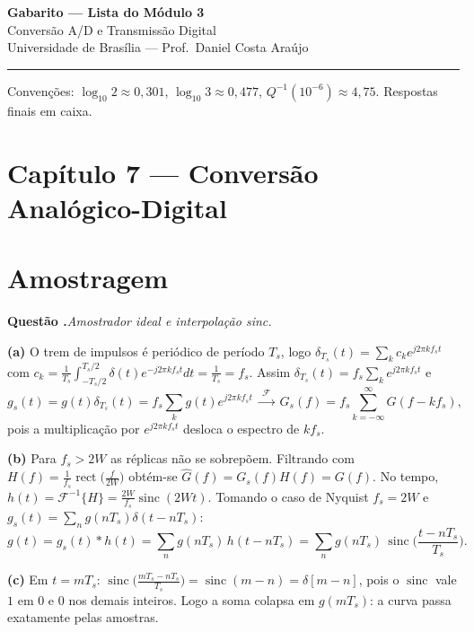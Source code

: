 \documentclass[11pt,a4paper]{article}
\newcommand{\sinc}{\operatorname{sinc}}
\newcommand{\rect}{\operatorname{rect}}
\newcounter{quest}
\newcommand{\Q}{\par\medskip\noindent\refstepcounter{quest}%
  \textbf{\color{unbprimary}Questão \thequest.}\enspace}
\newcommand{\resp}[1]{\ensuremath{\boxed{#1}}}
\begin{document}
\begin{center}
  {\LARGE\bfseries\color{unbprimary} Gabarito --- Lista do Módulo 3}\\[4pt]
  {\large Conversão A/D e Transmissão Digital}\\[6pt]
  {\small Universidade de Brasília --- Prof.\ Daniel Costa Araújo}
\end{center}

\vspace{0.2cm}
\noindent\rule{\textwidth}{0.6pt}
\small
Convenções: $\log_{10}2\approx0{,}301$, $\log_{10}3\approx0{,}477$,
$Q^{-1}(10^{-6})\approx4{,}75$. Respostas finais em caixa.
\normalsize

\section*{Capítulo 7 --- Conversão Analógico-Digital}

\section{Amostragem}

\Q\textit{Amostrador ideal e interpolação sinc.}

\textbf{(a)} O trem de impulsos é periódico de período $T_s$, logo
$\delta_{T_s}(t)=\sum_k c_k e^{j2\pi k f_s t}$ com
$c_k=\frac1{T_s}\int_{-T_s/2}^{T_s/2}\delta(t)e^{-j2\pi kf_st}dt=\frac1{T_s}=f_s$.
Assim $\delta_{T_s}(t)=f_s\sum_k e^{j2\pi kf_st}$ e
\[
  g_s(t)=g(t)\delta_{T_s}(t)=f_s\sum_k g(t)e^{j2\pi kf_st}
  \;\xrightarrow{\;\mathcal F\;}\;
  G_s(f)=f_s\sum_{k=-\infty}^{\infty}G(f-kf_s),
\]
pois a multiplicação por $e^{j2\pi kf_st}$ desloca o espectro de $kf_s$.

\textbf{(b)} Para $f_s>2W$ as réplicas não se sobrepõem. Filtrando com
$H(f)=\frac1{f_s}\rect\!\big(\frac{f}{2W}\big)$ obtém-se
$\hat G(f)=G_s(f)H(f)=G(f)$. No tempo,
$h(t)=\mathcal F^{-1}\{H\}=\frac{2W}{f_s}\sinc(2Wt)$. Tomando o caso de
Nyquist $f_s=2W$ e $g_s(t)=\sum_n g(nT_s)\delta(t-nT_s)$:
\[
  g(t)=g_s(t)*h(t)=\sum_n g(nT_s)\,h(t-nT_s)
       =\sum_{n}g(nT_s)\,\sinc\!\Big(\frac{t-nT_s}{T_s}\Big).
\]

\textbf{(c)} Em $t=mT_s$: $\sinc\!\big(\frac{mT_s-nT_s}{T_s}\big)=\sinc(m-n)
=\delta[m-n]$, pois o $\sinc$ vale $1$ em $0$ e $0$ nos demais inteiros.
Logo a soma colapsa em \resp{g(mT_s)}: a curva passa exatamente pelas amostras.
\end{document}
